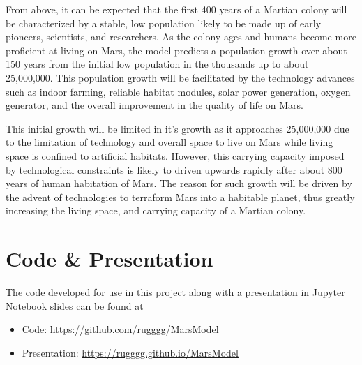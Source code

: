 \documentclass[12pt]{article}
\begin{document}
From above, it can be expected that the first 400 years of a Martian colony will be characterized by a stable, low population likely to be made up of early pioneers, scientists, and researchers. As the colony ages and humans become more proficient at living on Mars, the model predicts a population growth over about 150 years from the initial low population in the thousands up to about 25,000,000. This population growth will be facilitated by the technology advances such as indoor farming, reliable habitat modules, solar power generation, oxygen generator, and the overall improvement in the quality of life on Mars. 


This initial growth will be limited in it's growth as it approaches  25,000,000 due to the limitation of technology and overall space to live on Mars while living space is confined to artificial habitats. However, this carrying capacity imposed by technological constraints is likely to driven upwards rapidly after about 800 years of human habitation of Mars. The reason for such growth will be driven by the advent of technologies to terraform Mars into a habitable planet\cite{terraform}, thus greatly increasing the living space, and carrying capacity of a Martian colony. 

\section{Code \& Presentation}
The code developed for use in this project along with a presentation in Jupyter Notebook slides can be found at 
\begin{itemize}
\item{Code: \href{https://github.com/rugggg/MarsModel}{https://github.com/rugggg/MarsModel}}
\item{Presentation: \href{https://rugggg.github.io/MarsModel}{https://rugggg.github.io/MarsModel}}
\end{itemize}
\end{document}
